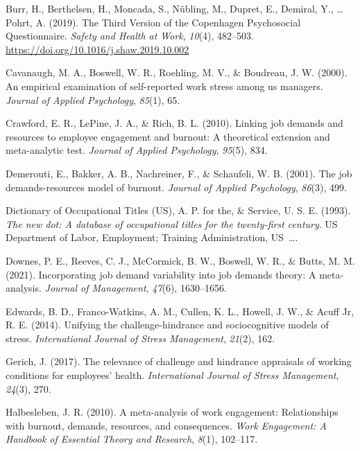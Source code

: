 \documentclass[
  english,
  man]{apa6}
\begin{document}
\leavevmode\hypertarget{ref-burr_third_2019}{}%
Burr, H., Berthelsen, H., Moncada, S., Nübling, M., Dupret, E., Demiral, Y., \ldots{} Pohrt, A. (2019). The Third Version of the Copenhagen Psychosocial Questionnaire. \emph{Safety and Health at Work}, \emph{10}(4), 482--503. \url{https://doi.org/10.1016/j.shaw.2019.10.002}

\leavevmode\hypertarget{ref-cavanaugh2000empirical}{}%
Cavanaugh, M. A., Boswell, W. R., Roehling, M. V., \& Boudreau, J. W. (2000). An empirical examination of self-reported work stress among us managers. \emph{Journal of Applied Psychology}, \emph{85}(1), 65.

\leavevmode\hypertarget{ref-crawford2010linking}{}%
Crawford, E. R., LePine, J. A., \& Rich, B. L. (2010). Linking job demands and resources to employee engagement and burnout: A theoretical extension and meta-analytic test. \emph{Journal of Applied Psychology}, \emph{95}(5), 834.

\leavevmode\hypertarget{ref-demerouti2001job}{}%
Demerouti, E., Bakker, A. B., Nachreiner, F., \& Schaufeli, W. B. (2001). The job demands-resources model of burnout. \emph{Journal of Applied Psychology}, \emph{86}(3), 499.

\leavevmode\hypertarget{ref-advisory1993new}{}%
Dictionary of Occupational Titles (US), A. P. for the, \& Service, U. S. E. (1993). \emph{The new dot: A database of occupational titles for the twenty-first century}. US Department of Labor, Employment; Training Administration, US~\ldots.

\leavevmode\hypertarget{ref-downes2021incorporating}{}%
Downes, P. E., Reeves, C. J., McCormick, B. W., Boswell, W. R., \& Butts, M. M. (2021). Incorporating job demand variability into job demands theory: A meta-analysis. \emph{Journal of Management}, \emph{47}(6), 1630--1656.

\leavevmode\hypertarget{ref-edwards2014unifying}{}%
Edwards, B. D., Franco-Watkins, A. M., Cullen, K. L., Howell, J. W., \& Acuff Jr, R. E. (2014). Unifying the challenge-hindrance and sociocognitive models of stress. \emph{International Journal of Stress Management}, \emph{21}(2), 162.

\leavevmode\hypertarget{ref-gerich2017relevance}{}%
Gerich, J. (2017). The relevance of challenge and hindrance appraisals of working conditions for employees' health. \emph{International Journal of Stress Management}, \emph{24}(3), 270.

\leavevmode\hypertarget{ref-halbesleben2010meta}{}%
Halbesleben, J. R. (2010). A meta-analysis of work engagement: Relationships with burnout, demands, resources, and consequences. \emph{Work Engagement: A Handbook of Essential Theory and Research}, \emph{8}(1), 102--117.
\end{document}
